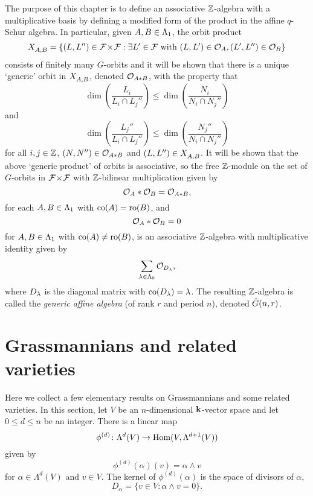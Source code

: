 \documentclass[a4paper, 11pt]{report}
\begin{document}
The purpose of this chapter is to define an associative $\mathbb{Z}$-algebra with a multiplicative basis by defining a modified form of the product in the affine $q$-Schur algebra. In particular, given $A,B\in\Lambda_1{}$, the orbit product
\begin{equation*}
X_{A,B}^{} = \{(L,L'')\in{\mathcal{F}\!\times\!\mathcal{F}}: \exists L'\in\mathcal{F}\text{ with } (L,L')\in\mathcal{O}_{A}, (L',L'')\in\mathcal{O}_{B}\}
\end{equation*}
consists of finitely many $G$-orbits and it will be shown that there is a unique `generic' orbit in $X_{A,B}^{}$, denoted $\mathcal{O}_{A\ast B}$, with the property that
\begin{equation*}
\dim\left(\frac{L_i}{L_i\cap L_j''}\right)\le\dim\left(\frac{N_i}{N_i\cap N_j''}\right)
\end{equation*}
and
\begin{equation*}
\dim\left(\frac{L_j''}{L_i\cap L_j''}\right)\le\dim\left(\frac{N_j''}{N_i\cap N_j''}\right)
\end{equation*}
for all $i,j\in\mathbb{Z}$, $(N,N'')\in\mathcal{O}_{A\ast B}$ and $(L,L'')\in X_{A,B}^{}$. It will be shown that the above `generic product' of orbits is associative, so the free $\mathbb{Z}$-module on the set of $G$-orbits in ${\mathcal{F}\!\times\!\mathcal{F}}$ with $\mathbb{Z}$-bilinear multiplication given by
\begin{equation*}
\mathcal{O}_{A}\ast\mathcal{O}_{B}=\mathcal{O}_{A\ast B},
\end{equation*}
for each $A,B\in\Lambda_1{}$ with $\operatorname{co}(A)=\operatorname{ro}(B)$, and
\begin{equation*}
\mathcal{O}_{A}\ast\mathcal{O}_{B} = 0
\end{equation*}
for $A,B\in\Lambda_1{}$ with $\operatorname{co}(A)\neq\operatorname{ro}(B)$, is an associative $\mathbb{Z}$-algebra with multiplicative identity given by
\begin{equation*}
\sum_{\lambda\in\Lambda_0{}} \mathcal{O}_{D_{\lambda}},
\end{equation*}
where $D_{\lambda}$ is the diagonal matrix with $\operatorname{co}(D_{\lambda})=\lambda$. The resulting $\mathbb{Z}$-algebra is called the \emph{generic affine algebra} (of rank $r$ and period $n$), denoted $\hat{G}(n,r)$.



\section{Grassmannians and related varieties}

Here we collect a few elementary results on Grassmannians and some related varieties. In this section, let $V$ be an $n$-dimensional $\mathbf{k}$-vector space and let $0\le d\le n$ be an integer. There is a linear map
\begin{equation*}
\phi^{(d)}\colon\Lambda^d(V)\to\operatorname{Hom}(V,\Lambda^{d+1}(V))
\end{equation*}
given by
\begin{equation*}
\phi^{(d)}(\alpha)(v)=\alpha\wedge v
\end{equation*}
for $\alpha\in\Lambda^d(V)$ and $v\in V$.
The kernel of $\phi^{(d)}(\alpha)$ is the space of divisors of $\alpha$,
\begin{equation*}
D_\alpha=\{v\in V:\alpha\wedge v=0\}.
\end{equation*}
\end{document}
